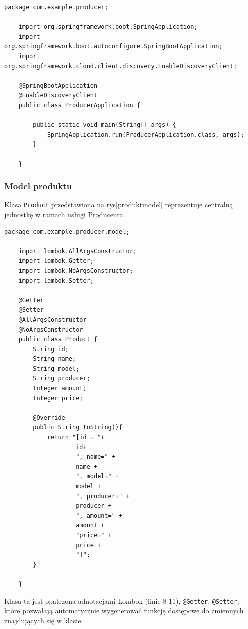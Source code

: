 \begin{lstlisting}[caption=Główna klasa usługi producenta, label=producerMainClass]
    package com.example.producer;

    import org.springframework.boot.SpringApplication;
    import org.springframework.boot.autoconfigure.SpringBootApplication;
    import org.springframework.cloud.client.discovery.EnableDiscoveryClient;
    
    @SpringBootApplication
    @EnableDiscoveryClient
    public class ProducerApplication {
    
        public static void main(String[] args) {
            SpringApplication.run(ProducerApplication.class, args);
        }
    
    }
\end{lstlisting}

\subsubsection{Model produktu}

Klasa \verb|Product| przedstawiona na rys\ref{produktmodel} reprezentuje centralną jednostkę w ramach usługi Producenta.

\begin{lstlisting}[caption=Klasa reprezentująca produkt, label=produktmodel]
    package com.example.producer.model;
    
    import lombok.AllArgsConstructor;
    import lombok.Getter;
    import lombok.NoArgsConstructor;
    import lombok.Setter;
    
    @Getter
    @Setter
    @AllArgsConstructor
    @NoArgsConstructor
    public class Product {
        String id;
        String name;
        String model;
        String producer;
        Integer amount;
        Integer price;
    
        @Override
        public String toString(){
            return "[id = "+
                    id+
                    ", name=" +
                    name +
                    ", model=" +
                    model +
                    ", producer=" +
                    producer +
                    ", amount=" +
                    amount +
                    "price=" +
                    price +
                    "]";
        }
    
    }
\end{lstlisting}

Klasa ta jest opatrzona adnotacjami Lombok (linie 8-11), \verb|@Getter|, \verb|@Setter|, które pozwalają automatycznie wygenerować funkcję dostępowe do zmiennych znajdujących się w klasie.

